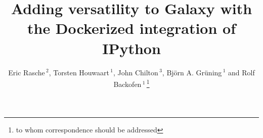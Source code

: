 \documentclass{bioinfo}
\begin{document}

\title[short Title]{Adding versatility to Galaxy with the Dockerized integration of IPython}
\author[Sample \textit{et~al}]{Eric Rasche\,$^{2}$, Torsten Houwaart\,$^{1}$, John Chilton\,$^{3}$, Bj\"orn A. Gr\"uning\,$^{1}$ and Rolf Backofen\,$^{1}$\,\footnote{to whom correspondence should be addressed}}
\address{$^{1}$Bioinformatics Group, Department of Computer Science, University of Freiburg\\
$^{2}$Center for Phage Technology, Texas A\&M University\\
$^{3}$Department of Biochemistry and Molecular Biology, Penn State University}




\maketitle
\end{document}
